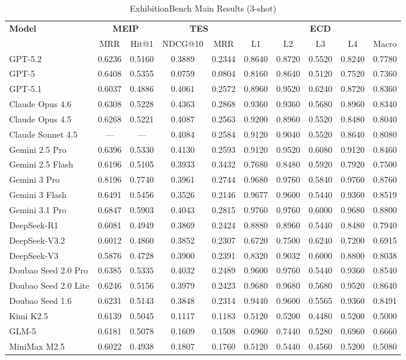 \begin{table}[ht]
\centering
\caption{ExhibitionBench Main Results (3-shot)}
\label{tab:main-results-shot3}
\begin{tabular}{l|cc|cc|ccccc}
\toprule
\textbf{Model} & \multicolumn{2}{c|}{\textbf{MEIP}} & \multicolumn{2}{c|}{\textbf{TES}} & \multicolumn{5}{c}{\textbf{ECD}} \\
 & MRR & Hit@1 & NDCG@10 & MRR & L1 & L2 & L3 & L4 & Macro \\
\midrule
GPT-5.2 & 0.6236 & 0.5160 & 0.3889 & 0.2344 & 0.8640 & 0.8720 & 0.5520 & 0.8240 & 0.7780 \\
GPT-5 & 0.6408 & 0.5355 & 0.0759 & 0.0804 & 0.8160 & 0.8640 & 0.5120 & 0.7520 & 0.7360 \\
GPT-5.1 & 0.6037 & 0.4886 & 0.4061 & 0.2572 & 0.8960 & 0.9520 & 0.6240 & 0.8720 & 0.8360 \\
Claude Opus 4.6 & 0.6308 & 0.5228 & 0.4363 & 0.2868 & 0.9360 & 0.9360 & 0.5680 & 0.8960 & 0.8340 \\
Claude Opus 4.5 & 0.6268 & 0.5221 & 0.4087 & 0.2563 & 0.9200 & 0.8960 & 0.5520 & 0.8480 & 0.8040 \\
Claude Sonnet 4.5 & — & — & 0.4084 & 0.2584 & 0.9120 & 0.9040 & 0.5520 & 0.8640 & 0.8080 \\
Gemini 2.5 Pro & 0.6396 & 0.5330 & 0.4130 & 0.2593 & 0.9120 & 0.9520 & 0.6080 & 0.9120 & 0.8460 \\
Gemini 2.5 Flash & 0.6196 & 0.5105 & 0.3933 & 0.3432 & 0.7680 & 0.8480 & 0.5920 & 0.7920 & 0.7500 \\
Gemini 3 Pro & 0.8196 & 0.7740 & 0.3961 & 0.2744 & 0.9680 & 0.9760 & 0.5840 & 0.9760 & 0.8760 \\
Gemini 3 Flash & 0.6491 & 0.5456 & 0.3526 & 0.2146 & 0.9677 & 0.9600 & 0.5440 & 0.9360 & 0.8519 \\
Gemini 3.1 Pro & 0.6847 & 0.5903 & 0.4043 & 0.2815 & 0.9760 & 0.9760 & 0.6000 & 0.9680 & 0.8800 \\
DeepSeek-R1 & 0.6081 & 0.4949 & 0.3869 & 0.2424 & 0.8880 & 0.8960 & 0.5440 & 0.8480 & 0.7940 \\
DeepSeek-V3.2 & 0.6012 & 0.4860 & 0.3852 & 0.2307 & 0.6720 & 0.7500 & 0.6240 & 0.7200 & 0.6915 \\
DeepSeek-V3 & 0.5876 & 0.4728 & 0.3900 & 0.2391 & 0.8320 & 0.9032 & 0.6000 & 0.8800 & 0.8038 \\
Doubao Seed 2.0 Pro & 0.6385 & 0.5335 & 0.4032 & 0.2489 & 0.9600 & 0.9760 & 0.5440 & 0.9360 & 0.8540 \\
Doubao Seed 2.0 Lite & 0.6246 & 0.5156 & 0.3979 & 0.2423 & 0.9680 & 0.9680 & 0.5680 & 0.9520 & 0.8640 \\
Doubao Seed 1.6 & 0.6231 & 0.5143 & 0.3848 & 0.2314 & 0.9440 & 0.9600 & 0.5565 & 0.9360 & 0.8491 \\
Kimi K2.5 & 0.6139 & 0.5045 & 0.1117 & 0.1183 & 0.5120 & 0.5200 & 0.4480 & 0.5200 & 0.5000 \\
GLM-5 & 0.6181 & 0.5078 & 0.1609 & 0.1508 & 0.6960 & 0.7440 & 0.5280 & 0.6960 & 0.6660 \\
MiniMax M2.5 & 0.6022 & 0.4938 & 0.1807 & 0.1760 & 0.5120 & 0.5440 & 0.4560 & 0.5200 & 0.5080 \\
\bottomrule
\end{tabular}
\end{table}